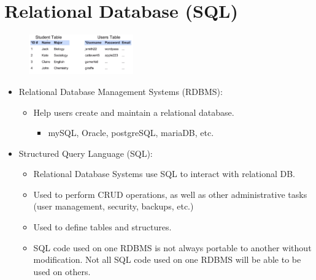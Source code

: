 \section{Relational Database (SQL)}
\begin{figure}[H]
    \centering
    \includegraphics[width=0.4\textwidth]{./figs/relational.png}
\end{figure}
\begin{itemize}
    \item Relational Database Management Systems (RDBMS):
        \begin{itemize}
            \item Help users create and maintain a relational database.
                \begin{itemize}
                    \item mySQL, Oracle, postgreSQL, mariaDB, etc. 
                \end{itemize}
        \end{itemize}
    
    \item Structured Query Language (SQL):
        \begin{itemize}
            \item Relational Database Systems use SQL to interact with relational DB.
            \item Used to perform CRUD operations, as well as other administrative tasks (user management, security, backups, etc.)
            \item Used to define tables and structures.
            \item SQL code used on one RDBMS is not always portable to another without modification. Not all SQL code used on one RDBMS will be able to be used on others.
        \end{itemize}
\end{itemize}

